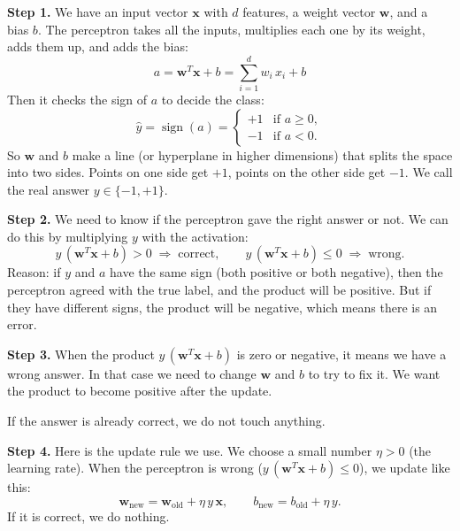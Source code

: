\documentclass[12pt, a4paper]{article}
\providecommand{\MyPageBorder}{}
\providecommand{\AddToShipoutPictureFG}[1]{}
\begin{document}
\AddToShipoutPictureFG{\MyPageBorder}

\newpage

\noindent\textbf{Step 1.}
We have an input vector $\mathbf{x}$ with $d$ features, a weight vector $\mathbf{w}$, and a bias $b$.  The perceptron takes all the inputs, multiplies each one by its weight, adds them up, and adds the bias:
\[
a = \mathbf{w}^{T}\mathbf{x} + b = \sum_{i=1}^{d} w_i\, x_i + b
\]
Then it checks the sign of $a$ to decide the class:
\[
\hat{y} = \operatorname{sign}(a) =
\begin{cases}
+1 & \text{if } a \geq 0,\\
-1 & \text{if } a < 0.
\end{cases}
\]
So $\mathbf{w}$ and $b$ make a line (or hyperplane in higher dimensions) that splits the space into two sides.  Points on one side get $+1$, points on the other side get $-1$.  We call the real answer $y \in \{-1,+1\}$.

\bigskip

\noindent\textbf{Step 2.}
We need to know if the perceptron gave the right answer or not.  We can do this by multiplying $y$ with the activation:
\[
y\,(\mathbf{w}^{T}\mathbf{x}+b) > 0 \;\Longrightarrow\; \text{correct}, \qquad
y\,(\mathbf{w}^{T}\mathbf{x}+b) \leq 0 \;\Longrightarrow\; \text{wrong}.
\]
Reason: if $y$ and $a$ have the same sign (both positive or both negative), then the perceptron agreed with the true label, and the product will be positive.  But if they have different signs, the product will be negative, which means there is an error.

\bigskip

\noindent\textbf{Step 3.}
When the product $y\,(\mathbf{w}^{T}\mathbf{x}+b)$ is zero or negative, it means we have a wrong answer.  In that case we need to change $\mathbf{w}$ and $b$ to try to fix it.  We want the product to become positive after the update.

If the answer is already correct, we do not touch anything.

\bigskip

\noindent\textbf{Step 4.}
Here is the update rule we use.  We choose a small number $\eta>0$ (the learning rate).  When the perceptron is wrong ($y\,(\mathbf{w}^{T}\mathbf{x}+b)\leq 0$), we update like this:
\[
\mathbf{w}_{\text{new}} = \mathbf{w}_{\text{old}} + \eta\, y\, \mathbf{x},
\qquad
b_{\text{new}} = b_{\text{old}} + \eta\, y.
\]
If it is correct, we do nothing.
\end{document}
